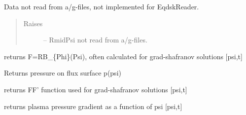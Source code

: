 \documentclass[letterpaper,10pt,english]{sphinxmanual}
\begin{document}
\begin{fulllineitems}
\begin{fulllineitems}
Data not read from a/g-files, not implemented for EqdskReader.
\begin{quote}\begin{description}
\item[{Raises}] \leavevmode
{} -- RmidPsi not read from a/g-files.

\end{description}\end{quote}

\end{fulllineitems}


\begin{fulllineitems}
\label{eqtools:eqtools.eqdskreader.EqdskReader.getF}
returns F=RB\_\{Phi\}(Psi), often calculated for grad-shafranov solutions  {[}psi,t{]}

\end{fulllineitems}


\begin{fulllineitems}
\label{eqtools:eqtools.eqdskreader.EqdskReader.getFluxPres}
Returns pressure on flux surface p(psi)

\end{fulllineitems}


\begin{fulllineitems}
\label{eqtools:eqtools.eqdskreader.EqdskReader.getFFPrime}
returns FF' function used for grad-shafranov solutions {[}psi,t{]}

\end{fulllineitems}


\begin{fulllineitems}
\label{eqtools:eqtools.eqdskreader.EqdskReader.getPPrime}
returns plasma pressure gradient as a function of psi {[}psi,t{]}

\end{fulllineitems}



\end{fulllineitems}
\end{document}
